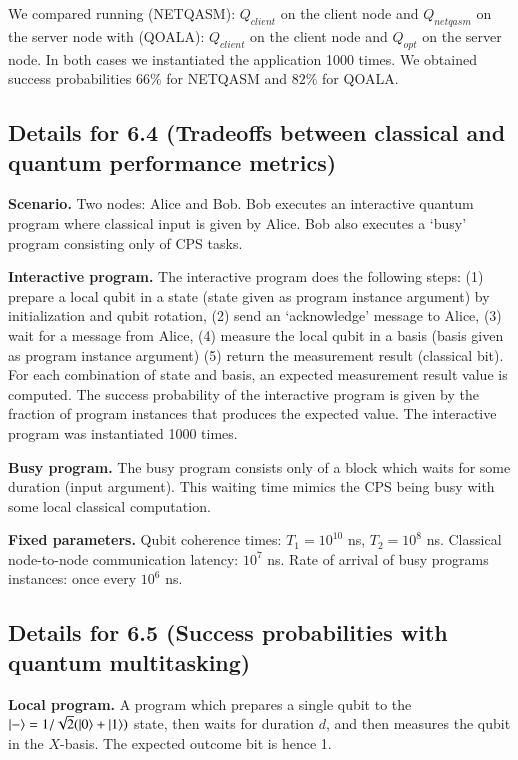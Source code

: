 We compared running (NETQASM): $Q_{client}$ on the client node and $Q_{netqasm}$ on the server node with (QOALA): $Q_{client}$ on the client node and $Q_{opt}$ on the server node. In both cases we instantiated the application 1000 times.
We obtained success probabilities $66\%$ for NETQASM and $82\%$ for QOALA.


\subsection{Details for 6.4 (Tradeoffs between classical and quantum performance metrics)}
\textbf{Scenario.}
Two nodes: Alice and Bob.
Bob executes an interactive quantum program where classical input is given by Alice.
Bob also executes a `busy' program consisting only of CPS tasks.

\textbf{Interactive program.}
The interactive program does the following steps:
(1) prepare a local qubit in a state (state given as program instance argument) by initialization and qubit rotation,
(2) send an `acknowledge' message to Alice,
(3) wait for a message from Alice,
(4) measure the local qubit in a basis (basis given as program instance argument)
(5) return the measurement result (classical bit).
For each combination of state and basis, an expected measurement result value is computed.
The success probability of the interactive program is given by the fraction of program instances that produces the expected value.
The interactive program was instantiated 1000 times.

\textbf{Busy program.}
The busy program consists only of a block which waits for some duration (input argument).
This waiting time mimics the CPS being busy with some local classical computation.

\textbf{Fixed parameters.}
Qubit coherence times: $T_1 = 10^{10}$ ns, $T_2 = 10^8$ ns.
Classical node-to-node communication latency: $10^7$ ns.
Rate of arrival of busy programs instances: once every $10^6$ ns.


\subsection{Details for 6.5 (Success probabilities with quantum multitasking)}
\textbf{Local program.}
A program which prepares a single qubit to the $\ket{-} = 1/\sqrt{2} (\ket{0} + \ket{1})$ state, then waits for duration $d$, and then measures the qubit in the $X$-basis. The expected outcome bit is hence 1.

